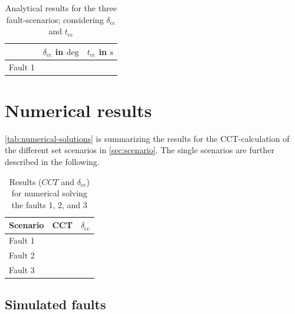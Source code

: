 \begin{table}[H]
        \small
        \centering
        \caption[Analytical results for the three fault-scenarios]{Analytical results for the three fault-scenarios; considering $\delta_\mathrm{cc}$ and $t_\mathrm{cc}$}
        \label{tab:res-analytical}
        \vspace{12pt}
        \begin{tabular}{|l|r|r|}
                \hline
                \rowcolor{lightgray} & $\delta_\mathrm{cc}$ in $\mathrm{deg}$ & $t_\mathrm{cc}$ in $\mathrm{s}$ \\ \hline \hline
                Fault 1              &                                        &                                 \\ \hline
        \end{tabular}
\end{table}

\section{Numerical results}

\autoref{tab:numerical-solutions} is summarizing the results for the \acs{CCT}-calculation of the different set scenarios in \autoref{sec:scenario}. The single scenarios are further described in the following.

\begin{table}[!htb]
        \small
        \centering
        \caption[Numerical results for \acs{CCT}-calculations]{Results ($CCT$ and $\delta_\mathrm{cc}$) for numerical solving the faults 1, 2, and 3}
        \label{tab:numerical-solutions}
        \vspace{12pt}
        \begin{tabular}{|l|r|r|}
                \hline
                \rowcolor{lightgray} Scenario & \acs{CCT} & $\delta_\mathrm{cc}$ \\ \hline \hline
                Fault 1                       &           &                      \\ \hline
                Fault 2                       &           &                      \\ \hline
                Fault 3                       &           &                      \\ \hline
        \end{tabular}
\end{table}

\subsection{Simulated faults}

